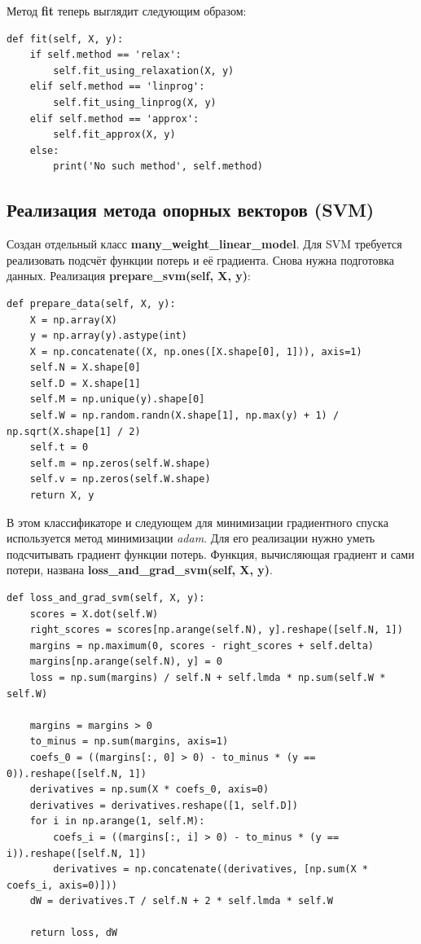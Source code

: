 \documentclass[a4paper]{article}
\begin{document}
Метод \textbf{fit} теперь выглядит следующим образом:
\begin{lstlisting}
def fit(self, X, y):
	if self.method == 'relax':
		self.fit_using_relaxation(X, y)
	elif self.method == 'linprog':
		self.fit_using_linprog(X, y)
	elif self.method == 'approx':
		self.fit_approx(X, y)
	else:
		print('No such method', self.method)
\end{lstlisting}

\subsection{Реализация метода опорных векторов (SVM)}

Создан отдельный класс \textbf{many\_weight\_linear\_model}. Для SVM требуется реализовать подсчёт функции потерь и её градиента. Снова нужна подготовка данных. Реализация \textbf{prepare\_svm(self, X, y)}:

\begin{lstlisting}
def prepare_data(self, X, y):
	X = np.array(X)
	y = np.array(y).astype(int)
	X = np.concatenate((X, np.ones([X.shape[0], 1])), axis=1)
	self.N = X.shape[0]
	self.D = X.shape[1]
	self.M = np.unique(y).shape[0]
	self.W = np.random.randn(X.shape[1], np.max(y) + 1) / np.sqrt(X.shape[1] / 2)
	self.t = 0
	self.m = np.zeros(self.W.shape)
	self.v = np.zeros(self.W.shape)
	return X, y
\end{lstlisting}

В этом классификаторе и следующем для минимизации градиентного спуска используется метод минимизации \textit{adam}. Для его реализации нужно уметь подсчитывать градиент функции потерь. Функция, вычисляющая градиент и сами потери, названа \textbf{loss\_and\_grad\_svm(self, X, y)}.
\begin{lstlisting}
def loss_and_grad_svm(self, X, y):
	scores = X.dot(self.W)
	right_scores = scores[np.arange(self.N), y].reshape([self.N, 1])
	margins = np.maximum(0, scores - right_scores + self.delta)
	margins[np.arange(self.N), y] = 0
	loss = np.sum(margins) / self.N + self.lmda * np.sum(self.W * self.W)
        
	margins = margins > 0
	to_minus = np.sum(margins, axis=1)
	coefs_0 = ((margins[:, 0] > 0) - to_minus * (y == 0)).reshape([self.N, 1])
	derivatives = np.sum(X * coefs_0, axis=0)
	derivatives = derivatives.reshape([1, self.D])
	for i in np.arange(1, self.M):
		coefs_i = ((margins[:, i] > 0) - to_minus * (y == i)).reshape([self.N, 1])
		derivatives = np.concatenate((derivatives, [np.sum(X * coefs_i, axis=0)]))
	dW = derivatives.T / self.N + 2 * self.lmda * self.W
        
	return loss, dW
\end{lstlisting}
\end{document}
